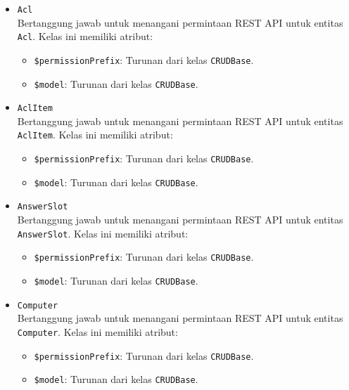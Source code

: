     \begin{itemize}
        \item \texttt{Acl}\\
            Bertanggung jawab untuk menangani permintaan REST API untuk entitas
            \texttt{Acl}. Kelas ini memiliki atribut:
            \begin{itemize}
                \item \texttt{\$permissionPrefix}: Turunan dari kelas
                \texttt{CRUDBase}.
                \item \texttt{\$model}: Turunan dari kelas \texttt{CRUDBase}.
            \end{itemize}
        
        \item \texttt{AclItem}\\
            Bertanggung jawab untuk menangani permintaan REST API untuk entitas
            \texttt{AclItem}. Kelas ini memiliki atribut:
            \begin{itemize}
                \item \texttt{\$permissionPrefix}: Turunan dari kelas
                \texttt{CRUDBase}.
                \item \texttt{\$model}: Turunan dari kelas \texttt{CRUDBase}.
            \end{itemize}
        
        \item \texttt{AnswerSlot}\\
            Bertanggung jawab untuk menangani permintaan REST API untuk entitas
            \texttt{AnswerSlot}. Kelas ini memiliki atribut:
            \begin{itemize}
                \item \texttt{\$permissionPrefix}: Turunan dari kelas
                \texttt{CRUDBase}.
                \item \texttt{\$model}: Turunan dari kelas \texttt{CRUDBase}.
            \end{itemize}
        
        \item \texttt{Computer}\\
            Bertanggung jawab untuk menangani permintaan REST API untuk entitas
            \texttt{Computer}. Kelas ini memiliki atribut:
            \begin{itemize}
                \item \texttt{\$permissionPrefix}: Turunan dari kelas
                \texttt{CRUDBase}.
                \item \texttt{\$model}: Turunan dari kelas \texttt{CRUDBase}.
            \end{itemize}
        

\end{itemize}
